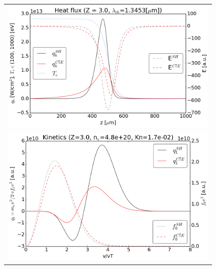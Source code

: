 \documentclass[preprint,12pt]{elsarticle}
\begin{document}
\begin{figure}[tbh]
  \begin{center}
    \begin{tabular}{c}
      \includegraphics[width=1.0\textwidth]{../results/fe_analysis/C7E/P5_heatflux_Z3_Kn16e-3.png} \\ 
      \includegraphics[width=1.0\textwidth]{../results/fe_analysis/C7E/P5_kinetics_Z3_Kn16e-3.png}
    \end{tabular}
  \caption{
  }
  \end{center}
  \label{fig:AWBScorrection_f1}
\end{figure}
\end{document}

